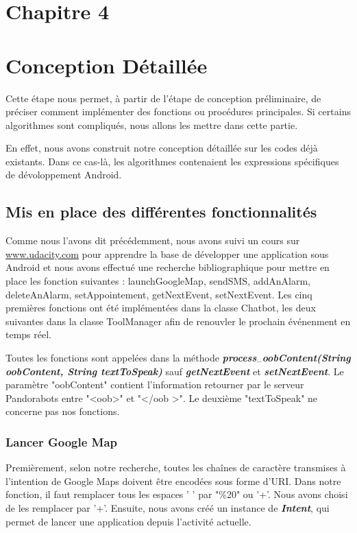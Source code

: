 \section*{Chapitre 4}
\section{Conception Détaillée}
\indent Cette étape nous permet, à partir de l'étape de conception préliminaire, de préciser comment implémenter des fonctions ou procédures principales. Si certains algorithmes sont compliqués, nous allons les mettre dans cette partie. 

\indent En effet, nous avons construit notre conception détaillée sur les codes déjà existants. Dans ce cas-là, les algorithmes contenaient les expressions spécifiques de dévoloppement Android.

\subsection{Mis en place des différentes fonctionnalités}
	
\indent Comme nous l'avons dit précédemment, nous avons suivi un cours sur \url{www.udacity.com} pour apprendre la base de développer une application sous Android et nous avons effectué une recherche bibliographique pour mettre en place les fonction suivantes : launchGoogleMap, sendSMS, addAnAlarm, deleteAnAlarm, setAppointement, getNextEvent, setNextEvent. Les cinq premières fonctions ont été implémentées dans la classe Chatbot, les deux suivantes dans la classe ToolManager afin de renouvler le prochain événenment en temps réel.

\indent Toutes les fonctions sont appelées dans la méthode \textbf{\emph{process$_-$oobContent(String oobContent, String textToSpeak)}} sauf \textbf{\emph{getNextEvent}} et \textbf{\emph{setNextEvent}}. Le paramètre "oobContent" contient l'information retourner par le serveur Pandorabots entre "<oob>" et "</oob >". Le deuxième "textToSpeak" ne concerne pas nos fonctions.

\subsubsection{Lancer Google Map}

\indent Premièrement, selon notre recherche, toutes les chaînes de caractère transmises à l'intention de Google Maps doivent être encodées sous forme d'URI. Dans notre fonction, il faut remplacer tous les espaces ' ' par "\%20" ou '+'. Nous avons choisi de les remplacer par '+'. Ensuite, nous avons créé un instance de \textbf{\emph{Intent}}, qui permet de lancer une application depuis l'activité actuelle. 

